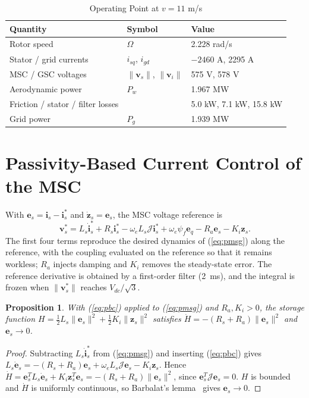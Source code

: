 \documentclass[conference]{IEEEtran}
\newtheorem{proposition}{Proposition}
\newcommand{\bv}[1]{\mathbf{#1}}
\newcommand{\Jm}{\boldsymbol{\mathcal{J}}}
\begin{document}
\begin{table}[t]
\caption{Operating Point at $v=11$ m/s}
\label{tab:op}
\centering
\footnotesize
\setlength{\tabcolsep}{4pt}
\begin{tabular}{lll}
\toprule
Quantity & Symbol & Value\\
\midrule
Rotor speed & $\Omega$ & 2.228 rad/s\\
Stator / grid currents & $i_{sq}$, $i_{gd}$ & $-2460$ A, 2295 A\\
MSC / GSC voltages & $\|\bv{v}_s\|$, $\|\bv{v}_i\|$ & 575 V, 578 V\\
Aerodynamic power & $P_w$ & 1.967 MW\\
Friction / stator / filter losses & & 5.0 kW, 7.1 kW, 15.8 kW\\
Grid power & $P_g$ & 1.939 MW\\
\bottomrule
\end{tabular}
\end{table}

\section{Passivity-Based Current Control of the MSC}
With $\bv{e}_s=\bv{i}_s-\bv{i}_s^*$ and $\dot{\bv{z}}_s=\bv{e}_s$, the MSC voltage reference is
\begin{equation}
\bv{v}_s^* = L_s\dot{\bv{i}}_s^* + R_s\bv{i}_s^* - \omega_eL_s\Jm\bv{i}_s^* + \omega_e\psi_f\bv{e}_q
- R_a\bv{e}_s - K_i\bv{z}_s .
\label{eq:pbc}
\end{equation}
The first four terms reproduce the desired dynamics of (\ref{eq:pmsg}) along the reference, with the
coupling evaluated on the reference so that it remains workless; $R_a$ injects damping and $K_i$
removes the steady-state error. The reference derivative is obtained by a first-order filter (2~ms),
and the integral is frozen when $\|\bv{v}_s^*\|$ reaches $V_{dc}/\sqrt3$.

\begin{proposition}
With (\ref{eq:pbc}) applied to (\ref{eq:pmsg}) and $R_a,K_i>0$, the storage function
$H=\frac12L_s\|\bv{e}_s\|^2+\frac12K_i\|\bv{z}_s\|^2$ satisfies $\dot H=-(R_s+R_a)\|\bv{e}_s\|^2$ and
$\bv{e}_s\to0$.
\end{proposition}
\begin{proof}
Subtracting $L_s\dot{\bv{i}}_s^*$ from (\ref{eq:pmsg}) and inserting (\ref{eq:pbc}) gives
$L_s\dot{\bv{e}}_s=-(R_s+R_a)\bv{e}_s+\omega_eL_s\Jm\bv{e}_s-K_i\bv{z}_s$. Hence
$\dot H=\bv{e}_s^TL_s\dot{\bv{e}}_s+K_i\bv{z}_s^T\bv{e}_s=-(R_s+R_a)\|\bv{e}_s\|^2$, since
$\bv{e}_s^T\Jm\bv{e}_s=0$. $H$ is bounded and $\dot H$ is uniformly continuous, so Barbalat's
lemma~\cite{khalil2002} gives $\bv{e}_s\to0$.
\end{proof}
\end{document}
